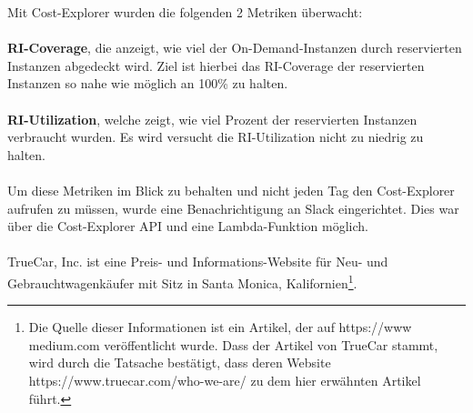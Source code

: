 Mit Cost-Explorer wurden die folgenden 2  Metriken überwacht: 
\\\\
\textbf{RI-Coverage}, die anzeigt, wie viel der On-Demand-Instanzen durch reservierten Instanzen abgedeckt wird. Ziel ist hierbei das RI-Coverage der reservierten Instanzen so nahe wie möglich an 100\% zu halten.
\\\\
\textbf{RI-Utilization}, welche zeigt, wie viel Prozent der reservierten Instanzen verbraucht wurden. Es wird versucht die RI-Utilization nicht zu niedrig zu halten.
\\\\
Um diese Metriken im Blick zu behalten und nicht jeden Tag den Cost-Explorer aufrufen zu müssen, wurde eine Benachrichtigung an Slack eingerichtet. Dies war über die Cost-Explorer API und eine Lambda-Funktion möglich.
\\\\
TrueCar, Inc. ist eine Preis- und Informations-Website für Neu- und Gebrauchtwagenkäufer mit Sitz in Santa Monica, Kalifornien\footnote{Die Quelle dieser Informationen ist ein Artikel, der auf https://www medium.com veröffentlicht wurde. Dass der Artikel von TrueCar stammt, wird durch die Tatsache bestätigt, dass deren Website https://www.truecar.com/who-we-are/ zu dem hier erwähnten Artikel führt.}.

